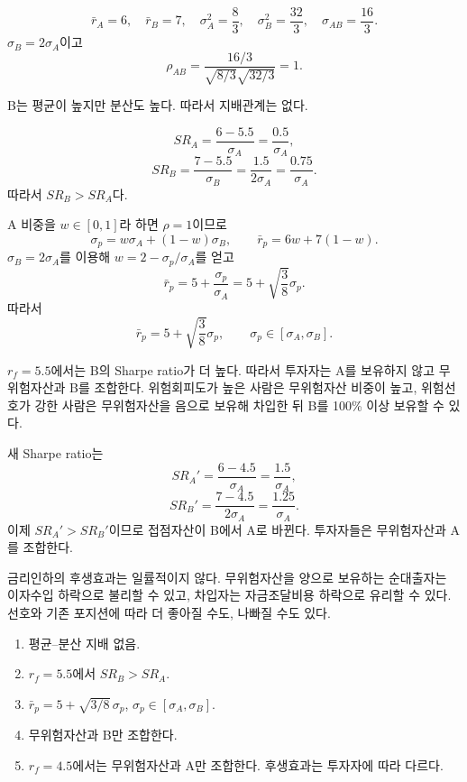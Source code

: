 \begin{solutionbox}
\[
\bar r_A=6,\quad\bar r_B=7,
\quad\sigma_A^2=\frac83,\quad\sigma_B^2=\frac{32}{3},
\quad\sigma_{AB}=\frac{16}{3}.
\]
$\sigma_B=2\sigma_A$이고
\[
\rho_{AB}=\frac{16/3}{\sqrt{8/3}\sqrt{32/3}}=1.
\]

B는 평균이 높지만 분산도 높다. 따라서 지배관계는 없다.

\[
SR_A=\frac{6-5.5}{\sigma_A}=\frac{0.5}{\sigma_A},
\]
\[
SR_B=\frac{7-5.5}{\sigma_B}=\frac{1.5}{2\sigma_A}=\frac{0.75}{\sigma_A}.
\]
따라서 $SR_B>SR_A$다.

A 비중을 $w\in[0,1]$라 하면 $\rho=1$이므로
\[
\sigma_p=w\sigma_A+(1-w)\sigma_B,
\qquad
\bar r_p=6w+7(1-w).
\]
$\sigma_B=2\sigma_A$를 이용해 $w=2-\sigma_p/\sigma_A$를 얻고
\[
\bar r_p=5+\frac{\sigma_p}{\sigma_A}
=5+\sqrt{\frac38}\sigma_p.
\]
따라서
\[
\boxed{\bar r_p=5+\sqrt{\frac38}\sigma_p,\qquad
\sigma_p\in[\sigma_A,\sigma_B]}.
\]

$r_f=5.5$에서는 B의 Sharpe ratio가 더 높다. 따라서 투자자는 A를 보유하지 않고 무위험자산과 B를 조합한다. 위험회피도가 높은 사람은 무위험자산 비중이 높고, 위험선호가 강한 사람은 무위험자산을 음으로 보유해 차입한 뒤 B를 100\% 이상 보유할 수 있다.

새 Sharpe ratio는
\[
SR_A'=\frac{6-4.5}{\sigma_A}=\frac{1.5}{\sigma_A},
\]
\[
SR_B'=\frac{7-4.5}{2\sigma_A}=\frac{1.25}{\sigma_A}.
\]
이제 $SR_A'>SR_B'$이므로 접점자산이 B에서 A로 바뀐다. 투자자들은 무위험자산과 A를 조합한다.

금리인하의 후생효과는 일률적이지 않다. 무위험자산을 양으로 보유하는 순대출자는 이자수입 하락으로 불리할 수 있고, 차입자는 자금조달비용 하락으로 유리할 수 있다. 선호와 기존 포지션에 따라 더 좋아질 수도, 나빠질 수도 있다.
\end{solutionbox}

\begin{answerbox}
\begin{enumerate}[label=(\alph*)]
\item 평균--분산 지배 없음.
\item $r_f=5.5$에서 $SR_B>SR_A$.
\item $\bar r_p=5+\sqrt{3/8}\,\sigma_p$, $\sigma_p\in[\sigma_A,\sigma_B]$.
\item 무위험자산과 B만 조합한다.
\item $r_f=4.5$에서는 무위험자산과 A만 조합한다. 후생효과는 투자자에 따라 다르다.
\end{enumerate}
\end{answerbox}

